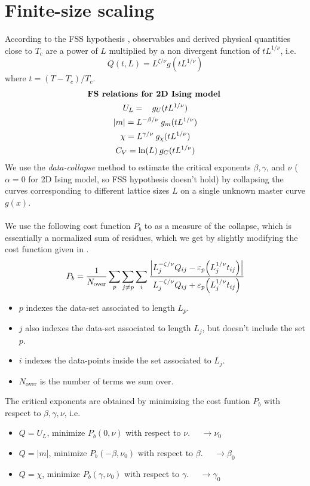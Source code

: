 \documentclass[../journal_main.tex]{subfiles}
\begin{document}
\section{Finite-size scaling}
According to the FSS hypothesis \cite{Sandvik_2010}, observables and derived physical quantities close to $T_c$ are a power of $L$ multiplied by a non divergent function of $tL^{1/\nu}$, i.e.
\[
    Q(t, L) = L^{\zeta/\nu} g(tL^{1/\nu}) 
\]
where $t = (T-T_c)/T_c$.
\begin{gather*}
    \text{\textbf{FS relations for 2D Ising model} } \\
    U_L =\:\:\: \: g_U(t L^{1/\nu}) \\ 
    |m| = L^{-\beta/\nu} \: g_{m}(t L^{1/\nu}) \\
    \chi = L^{\gamma/\nu} \: g_\chi(t L^{1/\nu}) \\
    C_V = \ln(L) \: g_C(t L^{1/\nu})
\end{gather*}
We use the \textit{data-collapse} method to estimate the critical exponents $\beta, \gamma$, and $\nu$ ($\alpha  = 0$ for 2D Ising model, so FSS hypothesis doesn't hold) by collapsing the curves corresponding to different lattice sizes $L$ on a single unknown master curve $g(x)$.~\\~\\
We use the following cost function $P_b$ to as a measure of the collapse, which is essentially a normalized sum of residues, which we get by slightly modifying the cost function given in \cite{Bhattacharjee_2001}.
\begin{equation}
    P_b = \frac{1}{N_\text{over}} \sum_p \sum_{j \neq p} \sum_i \frac{\qty|L_j^{-\zeta/\nu}Q_{ij} - \varepsilon_p\qty(L_j^{1/\nu} t_{ij})|}{L_j^{-\zeta/\nu}Q_{ij} + \varepsilon_p\qty(L_j^{1/\nu} t_{ij})}
\end{equation}    
\begin{itemize}
    \setlength{\itemsep}{0.1em}
    \item $p$ indexes the data-set associated to length $L_p$. 
    \item $j$ also indexes the data-set associated to length $L_j$, but doesn't include the set $p$.      
    \item $i$ indexes the data-points inside the set associated to $L_j$.   
    \item $N_\text{over}$ is the number of terms we sum over. 
\end{itemize} 
The critical exponents are obtained by minimizing the cost funtion $P_b$ with respect to $\beta, \gamma, \nu$, i.e. 
\begin{itemize}
    \setlength{\itemsep}{0.1em}
    \item $Q = U_L$, minimize $P_b(0, \nu)$ with respect to $\nu$. $\quad\longrightarrow \nu_0$
    \item $Q = |m|$, minimize $P_b(-\beta, \nu_0)$ with respect to $\beta$. $\quad\longrightarrow \beta_0$
    \item $Q = \chi$, minimize $P_b(\gamma, \nu_0)$ with respect to $\gamma$. $\quad\longrightarrow \gamma_0$   
\end{itemize}  
\end{document}

